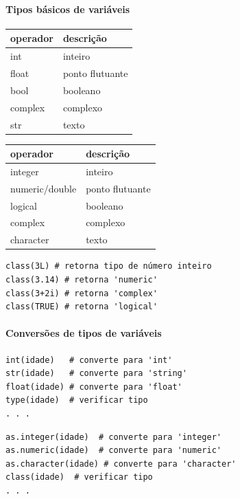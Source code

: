 \documentclass[12pt,a4paper]{article}
\begin{document}
    \hypertarget{tipos-buxe1sicos-de-variuxe1veis}{%
\paragraph{Tipos básicos de
variáveis}\label{tipos-buxe1sicos-de-variuxe1veis}}

    \begin{longtable}[]{@{}ll@{}}
\toprule
operador & descrição\tabularnewline
\midrule
\endhead
int & inteiro\tabularnewline
float & ponto flutuante\tabularnewline
bool & booleano\tabularnewline
complex & complexo\tabularnewline
str & texto\tabularnewline
\bottomrule
\end{longtable}

    \begin{longtable}[]{@{}ll@{}}
\toprule
operador & descrição\tabularnewline
\midrule
\endhead
integer & inteiro\tabularnewline
numeric/double & ponto flutuante\tabularnewline
logical & booleano\tabularnewline
complex & complexo\tabularnewline
character & texto\tabularnewline
\bottomrule
\end{longtable}

\begin{verbatim}
class(3L) # retorna tipo de número inteiro
class(3.14) # retorna 'numeric'
class(3+2i) # retorna 'complex'
class(TRUE) # retorna 'logical'
\end{verbatim}

    \hypertarget{conversuxf5es-de-tipos-de-variuxe1veis}{%
\paragraph{Conversões de tipos de
variáveis}\label{conversuxf5es-de-tipos-de-variuxe1veis}}

    \begin{verbatim}
int(idade)   # converte para 'int'
str(idade)   # converte para 'string'
float(idade) # converte para 'float'
type(idade)  # verificar tipo
. . .
\end{verbatim}

    \begin{verbatim}
as.integer(idade)  # converte para 'integer'
as.numeric(idade)  # converte para 'numeric'
as.character(idade) # converte para 'character'
class(idade)  # verificar tipo
. . .
\end{verbatim}
\end{document}

